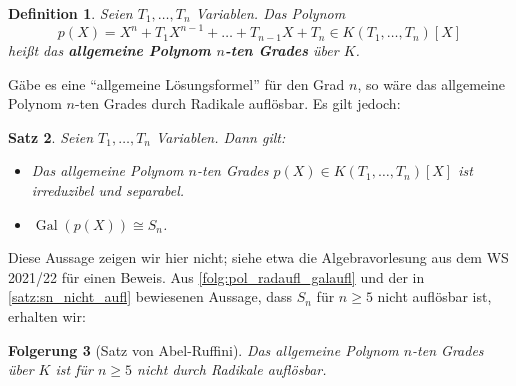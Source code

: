 \documentclass[a4paper, twoside, 11pt, ngerman]{report}
\DeclareMathOperator{\Gal}{Gal}
\theoremstyle{definistyle}
\newtheorem{satz}{Satz}[section]
\newtheorem{defini}[satz]{Definition}
\newtheorem{folgerung}[satz]{Folgerung}
\theoremstyle{remark}
\newcommand{\defn}[1]{\textit{\bfseries #1}}
\begin{document}
\begin{defini}
Seien $T_1, \dots, T_n$ Variablen.
Das Polynom
\[
p(X) = X^n + T_1 X^{n-1} + \dots + T_{n-1} X + T_n \in K(T_1, \dots, T_n)[X]
\]
heißt das \defn{allgemeine Polynom $n$-ten Grades} über $K$.
\end{defini}

Gäbe es eine "`allgemeine Lösungsformel"' für den Grad $n$, so wäre das allgemeine
Polynom $n$-ten Grades durch Radikale auflösbar. Es gilt jedoch:

\begin{satz}
Seien $T_1, \dots, T_n$ Variablen. Dann gilt:
\begin{itemize}
    \item[(a)] Das allgemeine Polynom $n$-ten Grades $p(X) \in K(T_1, \dots, T_n)[X]$ ist irreduzibel und separabel.
    \item[(b)] $\Gal(p(X)) \cong S_n$.
\end{itemize}
\end{satz}

Diese Aussage zeigen wir hier nicht; siehe etwa die Algebravorlesung aus dem WS 2021/22 für einen Beweis. Aus \ref{folg:pol_radaufl_galaufl} und der in \ref{satz:sn_nicht_aufl} bewiesenen Aussage, dass $S_n$ für $n\geq 5$ nicht auflösbar ist, erhalten wir:

\begin{folgerung}[Satz von Abel-Ruffini]
Das allgemeine Polynom $n$-ten Grades über $K$ ist für $n \geq 5$ nicht durch Radikale auflösbar.
\end{folgerung}
\end{document}
